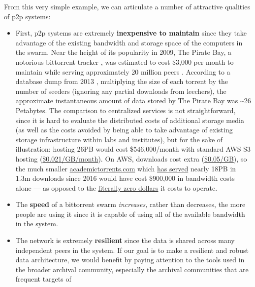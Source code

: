 From this very simple example, we can articulate a number of attractive
qualities of p2p systems:

\begin{itemize}
\tightlist
\item
  First, p2p systems are extremely \textbf{inexpensive to maintain}
  since they take advantage of the existing bandwidth and storage space
  of the computers in the swarm. Near the height of its popularity in
  2009, The Pirate Bay, a notorious bittorrent tracker \citep{vandersarPirateBayFive2011} , was estimated to cost \$3,000 per
  month to maintain while serving approximately 20 million peers \citep{roettgersPirateBayDistributing2009} . According to a database
  dump from 2013 \citep{PirateBayArchiveteam2020} , multiplying
  the size of each torrent by the number of seeders (ignoring any
  partial downloads from leechers), the approximate instantaneous amount
  of data stored by The Pirate Bay was \textasciitilde26 Petabytes. The
  comparison to centralized services is not straightforward, since it is
  hard to evaluate the distributed costs of additional storage media (as
  well as the costs avoided by being able to take advantage of existing
  storage infrastructure within labs and institutes), but for the sake
  of illustration: hosting 26PB would cost \$546,000/month with standard
  AWS S3 hosting
  (\href{https://aws.amazon.com/s3/pricing/?nc=sn\&loc=4}{\$0.021/GB/month}).
  On AWS, downloads cost extra
  (\href{https://aws.amazon.com/s3/pricing/?nc=sn\&loc=4}{\$0.05/GB}),
  so the much smaller
  \href{https://academictorrents.com}{academictorrents.com} which
  \href{https://github.com/academictorrents/academictorrents-docs/issues/31\#issuecomment-1155917166}{has
  served} nearly 18PB in 1.3m downloads since 2016 would have cost
  \$900,000 in bandwidth costs alone --- as opposed to the
  \href{https://github.com/academictorrents/academictorrents-docs/issues/31\#issuecomment-1152851111}{literally
  zero dollars} it costs to operate.
\item
  The \textbf{speed} of a bittorrent swarm \emph{increases,} rather than
  decreases, the more people are using it since it is capable of using
  all of the available bandwidth in the system.
\item
  The network is extremely \textbf{resilient} since the data is shared
  across many independent peers in the system. If our goal is to make a
  resilient and robust data architecture, we would benefit by paying
  attention to the tools used in the broader archival community,
  especially the archival communities that are frequent targets of

\end{itemize}
